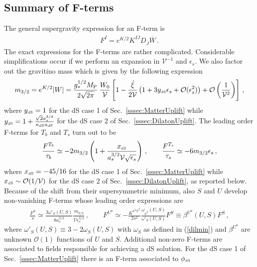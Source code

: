 \documentclass[12pt,a4paper]{book}
\def\dS{{\scriptscriptstyle \rm dS}}
\newcommand{\mc}{\mathcal}
\begin{document}
\subsection{Summary of F-terms}
\label{fterms}

The general supergravity expression for an F-term is~\cite{Kaplunovsky:1993rd, Brignole:1993dj}
\begin{align}
F^I = e^{K/2} K^{I \overline{J}} D_{\overline{J}} \overline{W}\,.
\end{align}
The exact expressions for the F-terms are rather complicated. Considerable simplifications occur if we perform an expansion in $\mathcal{V}^{-1}$ and $\epsilon_s$. We also factor out the gravitino mass which is given by the following expression
\begin{align}
m_{3/2}=e^{K/2} |W|= \frac{g_s^{1/2} M_{\rm P}}{2\sqrt{2\pi}}\,\frac{W_0}{\mathcal{V}} \left[ 1-\frac{\hat{\xi}}{2\mathcal{V}}
\left(1+3 y_\dS \epsilon_s+\mc{O}(\epsilon_s^2)\right)+\mc{O}\left(\frac{1}{\mathcal{V}^2}\right)\right]\,,
\label{expandm32}
\end{align}
where $y_\dS =1$ for the dS case 1 of Sec.~\ref{sssec:MatterUplift} while $y_\dS = 1+\frac{\sqrt{2} a_s^{3/4}}{\kappa_\dS a_\dS}$ for the dS case 2 of Sec.~\ref{sssec:DilatonUplift}. The leading order F-terms for $T_b$ and $T_s$ turn out to be
\begin{align}
\frac{F^{T_b}}{\tau_b} \simeq - 2 m_{3/2} \left(1+\frac{x_\dS}{a_s^{3/2} \mathcal{V}\sqrt{\epsilon_s}}\right)\,,
\qquad
\frac{F^{T_s}}{\tau_s} \simeq - 6   m_{3/2} \epsilon_s\,,
\label{FTb}
\end{align}
where $x_\dS = - 45/16$ for the dS case 1 of Sec.~\ref{sssec:MatterUplift} while $x_\dS \sim \mc{O}(1/\mathcal{V})$ for the dS case 2 of Sec.~\ref{sssec:DilatonUplift}, as reported below. Because of the shift from their supersymmetric minimum, also $S$ and $U$ develop non-vanishing F-terms whose leading order
expressions are
\begin{align}
\label{ds}
\frac{F^S}{s} \simeq \frac{3 \omega'_S(U,S) }{8 a_s^{3/2}}  \frac{m_{3/2}}{\mathcal{V}\epsilon_s^{3/2}}\,, \qquad
F^{U^a} \simeq - \frac{K^{U^a \overline{U}^{\overline{b}}}}{2 s^2}\frac{\omega_{\overline{U}^{\overline{b}}}(U,S)}{\omega'_S(U,S)}F^S\equiv \beta^{U^a}(U,S)F^S\,,
\end{align}
where $\omega'_S(U,S) \equiv 3 - 2 \omega_S(U,S)$ with $\omega_S$ as defined in (\ref{dilmin}) and $\beta^{U^a}$ are unknown $\mc{O}(1)$ functions of $U$ and $S$. Additional non-zero F-terms are associated to fields responsible for achieving a dS solution. For the dS case 1 of Sec.~\ref{sssec:MatterUplift} there is an F-term associated to $\phi_\dS$
\end{document}
